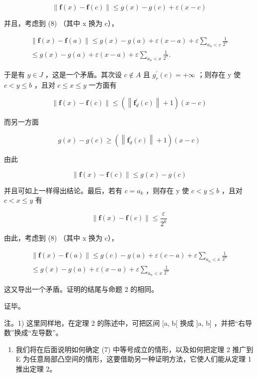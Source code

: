 \[
\| \mathbf {f} (x) - \mathbf {f} (c) \| \leqslant g (x) - g (c) + \varepsilon (x - c)
\]

并且，考虑到 (8) （其中 x 换为 c），

\[
\begin{array}{c} \| \mathbf {f} (x) - \mathbf {f} (a) \| \leqslant g (x) - g (a) + \varepsilon (x - a) + \varepsilon \sum_ {a _ {n} <   c} \frac {1}{2 ^ {n}} \\ \leqslant g (x) - g (a) + \varepsilon (x - a) + \varepsilon \sum_ {a _ {n} <   x} \frac {1}{2 ^ {n}}. \end{array}
\]

于是有 \(y \in J\) ，这是一个矛盾。其次设 \(c \notin A\) 且 \(g_{r}^{\prime}(c) = +\infty\) ；则存在 y 使 \(c < y \leqslant b\) ，且对 \(c \leqslant x \leqslant y\) 一方面有

\[
\left\| \mathbf {f} (x) - \mathbf {f} (c) \right\| \leqslant \left(\left\| \mathbf {f} _ {d} ^ {\prime} (c) \right\| + 1\right) (x - c)
\]

而另一方面

\[
g (x) - g (c) \geqslant \left(\left\| \mathbf {f} _ {d} ^ {\prime} (c) \right\| + 1\right) (x - c)
\]

由此

\[
\| \mathbf {f} (x) - \mathbf {f} (c) \| \leqslant g (x) - g (c)
\]

并且可如上一样得出结论。最后，若有 \(c = a_{k}\) ，则存在 y 使 \(c < y \leqslant b\) ，且对 \(c < x \leqslant y\) 有

\[
\| \mathbf {f} (x) - \mathbf {f} (c) \| \leqslant \frac {\varepsilon}{2 ^ {k}}
\]

由此，考虑到 (8) （其中 x 换为 c），

\[
\begin{array}{c} \| \mathbf {f} (x) - \mathbf {f} (a) \| \leqslant g (c) - g (a) + \varepsilon (c - a) + \varepsilon \sum_ {a _ {n} <   x} \frac {1}{2 ^ {n}} \\ \leqslant g (x) - g (a) + \varepsilon (x - a) + \varepsilon \sum_ {a _ {n} <   x} \frac {1}{2 ^ {n}} \end{array}
\]

这又导出一个矛盾。证明的结尾与命题 2 的相同。

证毕。

注。1) 这里同样地，在定理 2 的陈述中，可把区间 {[}a, b{[} 换成 {]}a, b{]} ，并把“右导数”换成“左导数”。

\begin{enumerate}
\def\labelenumi{\arabic{enumi})}
\setcounter{enumi}{1}
\tightlist
\item
  我们将在后面说明如何确定 (7) 中等号成立的情形，以及如何把定理 2 推广到 E 为任意局部凸空间的情形，这要借助另一种证明方法，它使人们能从定理 1 推出定理 2。
\end{enumerate}

